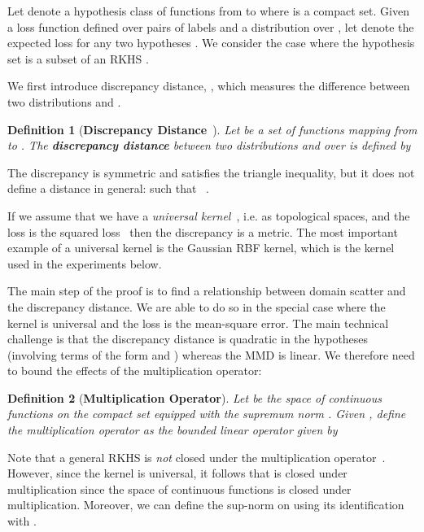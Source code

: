 \documentclass[10pt,journal,compsoc]{IEEEtran}
\newtheorem{defn}{Definition}
\begin{document}
Let   denote a hypothesis class of functions from  to  where  is a compact set. Given a loss function defined over pairs of labels
 and a distribution  over , let 
 denote the expected loss for any two hypotheses .
We consider the case where the hypothesis set  is a subset of an RKHS .

We first introduce discrepancy distance, , which measures the difference between two distributions  and .

\begin{defn}[\textbf{Discrepancy Distance}~\cite{Mansour2009}]
\label{def:disc}
Let  be a set of functions mapping from  to .
The \textbf{discrepancy distance} between two distributions  and  over  is defined by

\end{defn}
The discrepancy is symmetric and satisfies the triangle inequality, but it does not define a distance in general:  such that ~\cite{Mansour2009}. 

If we assume that we have a \emph{universal kernel}~\cite{Steinwart:2002aa,micchelli:06}, i.e.  as topological spaces, and the loss  is the squared loss~\cite{Cortes:2014} then the discrepancy is a metric. The most important example of a universal kernel is the Gaussian RBF kernel, which is the kernel used in the experiments below.

The main step of the proof is to find a relationship between domain scatter and the discrepancy distance. We are able to do so in the special case where the kernel is universal and the loss is the mean-square error. The main technical challenge is that the discrepancy distance is quadratic in the hypotheses (involving terms of the form  and ) whereas the MMD is linear. We therefore need to bound the effects of the multiplication operator:


\begin{defn}[\textbf{Multiplication Operator}]
 \label{def:mulop}
 Let  be the space of continuous functions on the compact set  equipped with the supremum norm . 
 Given , define the multiplication operator as the bounded linear operator  given by
 
\end{defn}

Note that a general RKHS is \emph{not} closed under the multiplication operator~\cite{Grunewalder:2013}. However, since the kernel is universal, it follows that  is closed under multiplication since the space of continuous functions  is closed under multiplication. Moreover, we can define the sup-norm  on  using its identification with .
\end{document}
